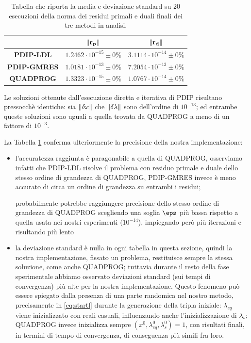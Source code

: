 \begin{table}[!h]
\centering
\begin{tabular}{c|c|c}
\textbf{}           & $\mathbf{\left\lVert r_p\right\rVert}$ & $\mathbf{\left\lVert r_d\right\rVert}$ \\\hline
\textbf{PDIP-LDL} &      $1.2462\cdot10^{-15} \pm0\%$                 &           $3.1114\cdot10^{-14} \pm0\%$             \\\hline
\textbf{PDIP-GMRES}   &        $1.0181\cdot10^{-13} \pm0\%$               &            $7.2054\cdot10^{-13} \pm0\%$           \\\hline
\textbf{QUADPROG}   &      $1.3323\cdot10^{-15} \pm0\%$                &            $1.0767\cdot10^{-14} \pm0\%$   \\    
\end{tabular}
\caption{Tabella che riporta la media e deviazione standard su 20 esecuzioni della norma dei residui primali e duali finali dei tre metodi in analisi.}
\label{tab:res}
\end{table}

Le soluzioni ottenute dall'esecuzione diretta e iterativa di PDIP risultano pressocchè identiche: sia $\left\lVert\delta x\right\rVert$ che $\left\lVert\delta\lambda\right\rVert$ sono dell'ordine di $10^{-13}$; ed entrambe queste soluzioni sono uguali a quella trovata da QUADPROG a meno di un fattore di $10^{-3}$.

La Tabella \ref{tab:res} conferma ulteriormente la precisione della nostra implementazione: 
\begin{itemize}
    \item l'accuratezza raggiunta è paragonabile a quella di QUADPROG, osserviamo infatti che PDIP-LDL risolve il problema con residuo primale e duale dello stesso ordine di grandezza di QUADPROG, PDIP-GMRES invece è meno accurato di circa un ordine di grandezza su entrambi i residui;
    
    probabilmente potrebbe raggiungere precisione dello stesso ordine di grandezza di QUADPROG scegliendo una soglia $\eps$ più bassa rispetto a quella usata nei nostri esperimenti ($10^{-14}$), impiegando però più iterazioni e risultando più lento
    \item la deviazione standard è nulla in ogni tabella in questa sezione, quindi la nostra implementazione, fissato un problema, restituisce sempre la stessa soluzione, come anche QUADPROG; tuttavia durante il resto della fase sperimentale abbiamo osservato deviazioni standard (sui tempi di convergenza) più alte per la nostra implementazione. Questo fenomeno può essere spiegato dalla presenza di una parte randomica nel nostro metodo, precisamente in \ref{eq:startl} durante la generazione della tripla iniziale: $\lambda_{eq}$ viene inizializzato con reali casuali, influenzando anche l'inizializzazione di $\lambda_s$; QUADPROG invece inizializza sempre $(x^0, \lambda_{eq}^0, \lambda_s^0) = 1$, con risultati finali, in termini di tempo di convergenza, di conseguenza più simili fra loro.
\end{itemize}